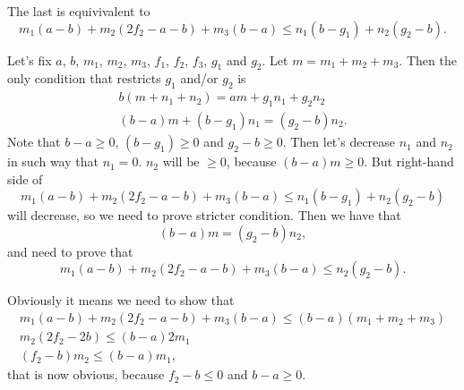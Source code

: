 \documentclass[12pt,a4paper]{article}
\begin{document}
\begin{enumproblem}
        The last is equivivalent to
        \[
            m_1 (a - b) + m_2 (2f_2 - a - b) + m_3 (b - a) \leqslant n_1 (b - g_1) + n_2 (g_2 - b).
        \]
        
        Let's fix $a$, $b$, $m_1$, $m_2$, $m_3$, $f_1$, $f_2$, $f_3$, $g_1$ and $g_2$. Let $m = m_1 + m_2 + m_3$. Then the only condition that restricts $g_1$ and/or $g_2$ is
        \begin{gather*}
            b(m + n_1 + n_2) = a m + g_1 n_1 + g_2 n_2\\
            (b - a) m + (b - g_1) n_1 = (g_2 - b) n_2.
        \end{gather*}
        Note that $b - a \geqslant 0$, $(b - g_1) \geqslant 0$ and $g_2 - b \geqslant 0$. Then let's decrease $n_1$ and $n_2$ in such way that $n_1 = 0$. $n_2$ will be $\geqslant 0$, because $(b - a) m \geqslant 0$. But right-hand side of
        \[
            m_1 (a - b) + m_2 (2f_2 - a - b) + m_3 (b - a) \leqslant n_1 (b - g_1) + n_2 (g_2 - b)
        \]
        will decrease, so we need to prove stricter condition. Then we have that
        \[(b - a) m = (g_2 - b) n_2,\]
        and need to prove that
        \[m_1 (a - b) + m_2 (2f_2 - a - b) + m_3 (b - a) \leqslant n_2 (g_2 - b).\]

        Obviously it means we need to show that
        \begin{gather*}
            m_1 (a - b) + m_2 (2f_2 - a - b) + m_3 (b - a) \leqslant (b - a) (m_1 + m_2 + m_3)\\
            m_2 (2f_2 - 2b) \leqslant (b - a) 2m_1\\
            (f_2 - b) m_2 \leqslant (b - a) m_1,
        \end{gather*}
        that is now obvious, because $f_2 - b \leqslant 0$ and $b - a \geqslant 0$.
    \end{enumproblem}
\end{document}
